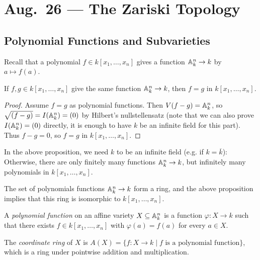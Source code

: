 \chapter{Aug.~26 --- The Zariski Topology}

\section{Polynomial Functions and Subvarieties}

\begin{remark}
  Recall that a polynomial
  $f \in k[x_1, \dots, x_n]$
  gives a function
  $\mathbb{A}_k^n \to k$ by
  $a \mapsto f(a)$.
\end{remark}

\begin{prop}
  If $f, g \in k[x_1, \dots, x_n]$
  give the same function
  $\mathbb{A}_k^n \to k$, then
  $f = g$ in $k[x_1, \dots, x_n]$.
\end{prop}

\begin{proof}
  Assume $f = g$ as polynomial functions.
  Then $V(f - g) = \mathbb{A}_k^n$, so
  $\sqrt{(f - g)} = I(\mathbb{A}_k^n) = (0)$
  by Hilbert's nullstellensatz (note that
  we can also prove $I(\mathbb{A}_k^n) = (0)$
  directly, it is enough to have $k$ be an infinite field for this part). Thus
  $f - g = 0$, so $f = g$ in $k[x_1, \dots, x_n]$.
\end{proof}

\begin{remark}
  In the above proposition, we need
  $k$ to be an infinite field (e.g.
  if $k = \overline{k}$): Otherwise,
  there are only finitely many functions
  $\mathbb{A}_k^n \to k$, but infinitely
  many polynomials in $k[x_1, \dots, x_n]$.
\end{remark}

\begin{remark}
  The set of polynomials functions
  $\mathbb{A}_k^n \to k$ form a ring, and
  the above proposition implies that this
  ring is isomorphic to $k[x_1, \dots, x_n]$.
\end{remark}

\begin{definition}
  A \emph{polynomial function} on an
  affine variety $X \subseteq \mathbb{A}_k^n$
  is a function $\varphi : X \to k$ such
  that there exists $f \in k[x_1, \dots, x_n]$
  with $\varphi(a) = f(a)$ for
  every $a \in X$.
\end{definition}

\begin{definition}
  The \emph{coordinate ring} of $X$ is
  $A(X) = \{f : X \to k \mid f \text{ is a polynomial function}\}$,
  which is a ring under pointwise addition
  and multiplication.
\end{definition}

